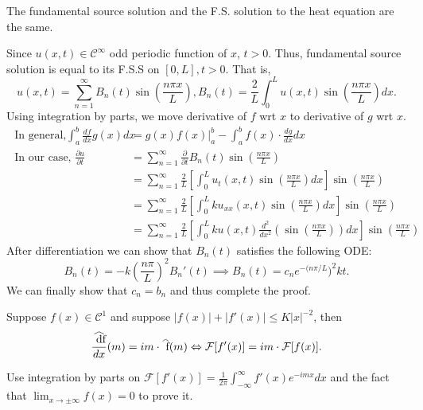 \documentclass[class=article,crop=false]{standalone}
\begin{document}
\begin{claim}[]
The fundamental source solution and the F.S. solution to the heat equation are the same.
\end{claim}
\begin{prf}
	Since $ u(x,t) \in \mathcal{ C}^{\infty}$ odd periodic function of $ x$,  $ t>0$. Thus, fundamental source solution is equal to its F.S.S on $ [0,L], t>0$. That is,
	\[
		u(x,t) = \sum_{ n= 1}^{\infty} B_n(t) \sin \left( \frac{ n\pi x}{ L} \right) , B_n(t) = \frac{2}{L} \int_{0}^{L} u(x,t) \sin \left( \frac{ n\pi x}{ L} \right) dx 
	.\] 
Using integration by parts, we move derivative of $ f$ wrt $ x$ to derivative of  $ g$ wrt  $ x$. 
	\begin{align*}
	\text{ In general,} 	\int_{ a}^{ b} \frac{df}{dx} g(x) dx &= g(x) f(x) \bigg |_{a}^b - \int_{ a}^{ b} f(x) \cdot \frac{dg}{dx} dx \\
	\text{ In our case, } 	\frac{\partial u}{\partial t} &= \sum_{ n= 1}^{\infty} \frac{\partial }{\partial t} B_n(t) \sin \left( \frac{ n\pi x}{ L} \right)  \\
							      &= \sum_{ n= 1}^{\infty} \frac{2}{L} \left[\int_{0}^{L} u_t(x,t) \sin \left( \frac{ n\pi x}{ L} \right) dx \right] \sin \left( \frac{ n\pi x}{ L} \right)   \\
							      &= \sum_{ n= 1}^{\infty} \frac{2}{L} \left[ \int_{0}^{L} k u_{xx}(x,t) \sin \left( \frac{ n\pi x}{ L} \right) dx \right] \sin \left( \frac{ n\pi x}{ L} \right)   \\
							      &= \sum_{ n= 1}^{\infty} \frac{2}{L}\left[ \int_{0}^{L} k u(x,t) \frac{d^2 }{d x^2} \left( \sin \left( \frac{ n\pi x}{ L} \right) \right) dx \right] \sin \left( \frac{ n\pi x}{ L} \right)   	
	\end{align*}
	After differentiation we can show that $ B_n(t)$ satisfies the following ODE:
	\[
		B_n(t) = -k\left( \frac{n \pi}{L } \right)^2 B_n'(t) \implies B_n(t) = c_n e^{-(n\pi /L})^2 kt 
	.\] 
	We can finally show that $ c_n = b_n$ and thus complete the proof.
\end{prf}

\begin{thm}
	Suppose $ f(x) \in \mathcal{ C}^1$ and suppose $ |f(x)|+ |f'(x)| \leq K |x|^{-2}$, then
	\[
		\frac{\wh{ df}}{dx }(m) = im \cdot \wh{ f}(m) \iff \mathcal{ F} [f'(x)] = im \cdot \mathcal{ F}[f(x)].
	\]
\end{thm}
\begin{prf}
	Use integration by parts on $ \mathcal{ F}[f'(x)] =\frac{1}{2\pi} \int_{-\infty}^{\infty} f'(x) e^{-imx} dx$ and the fact that $ \lim_{ x \to \pm \infty} f(x) = 0$ to prove it. 
\end{prf}
\end{document}
